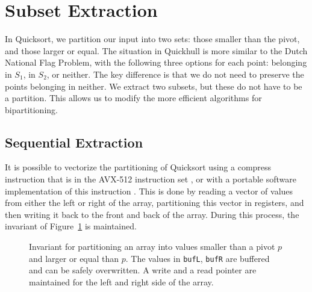 \section{Subset Extraction}

In Quicksort, we partition our input into two sets: those smaller than the 
pivot, and those larger or equal. The situation in Quickhull is more similar
to the Dutch National Flag Problem, with the following three options for each
point: belonging in $S_1$, in $S_2$, or neither. The key difference is that
we do not need to preserve the points belonging in neither. We extract two
subsets, but these do not have to be a partition.
This allows us to modify the more efficient algorithms for bipartitioning.

\subsection{Sequential Extraction}

It is possible to vectorize the partitioning of Quicksort using a compress
instruction that is in the AVX-512 instruction set \cite{Bramas17},
or with a portable software implementation of this instruction \cite{Blacher22}.
This is done by reading a vector of values from either the left or right of the
array, partitioning this vector in registers, and then writing it back to the
front and back of the array. During this process, the invariant of 
Figure~\ref{fig:invariant_bramas} is maintained.

\begin{figure}[ht]
    \caption{Invariant for partitioning an array into values smaller than
             a pivot $p$ and larger or equal than $p$. The values in
             \texttt{bufL}, \texttt{bufR} are buffered and can be safely
             overwritten. A write and a read pointer are maintained for
             the left and right side of the array.}
    \label{fig:invariant_bramas}
\end{figure}

